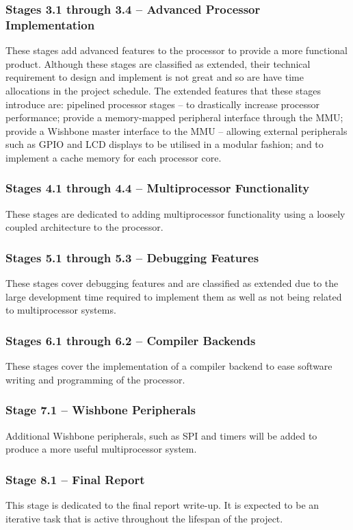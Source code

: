 \subsubsection{Stages 3.1 through 3.4 -- Advanced Processor Implementation}
These stages add advanced features to the processor to provide a more functional product. Although these stages are classified as extended, their technical requirement to design and implement is not great and so are have time allocations in the project schedule. The extended features that these stages introduce are: pipelined processor stages -- to drastically increase processor performance; provide a memory-mapped peripheral interface through the MMU; provide a Wishbone master interface to the MMU -- allowing external peripherals such as GPIO and LCD displays to be utilised in a modular fashion; and to implement a cache memory for each processor core.

\subsubsection{Stages 4.1 through 4.4 -- Multiprocessor Functionality}
These stages are dedicated to adding multiprocessor functionality using a loosely coupled architecture to the processor.

\subsubsection{Stages 5.1 through 5.3 -- Debugging Features}
These stages cover debugging features and are classified as extended due to the large development time required to implement them as well as not being related to multiprocessor systems.

\subsubsection{Stages 6.1 through 6.2 -- Compiler Backends}
These stages cover the implementation of a compiler backend to ease software writing and programming of the processor.

\subsubsection{Stage 7.1 -- Wishbone Peripherals}
Additional Wishbone peripherals, such as SPI and timers will be added to produce a more useful multiprocessor system.

\subsubsection{Stage 8.1 -- Final Report}
This stage is dedicated to the final report write-up. It is expected to be an iterative task that is active throughout the lifespan of the project.

